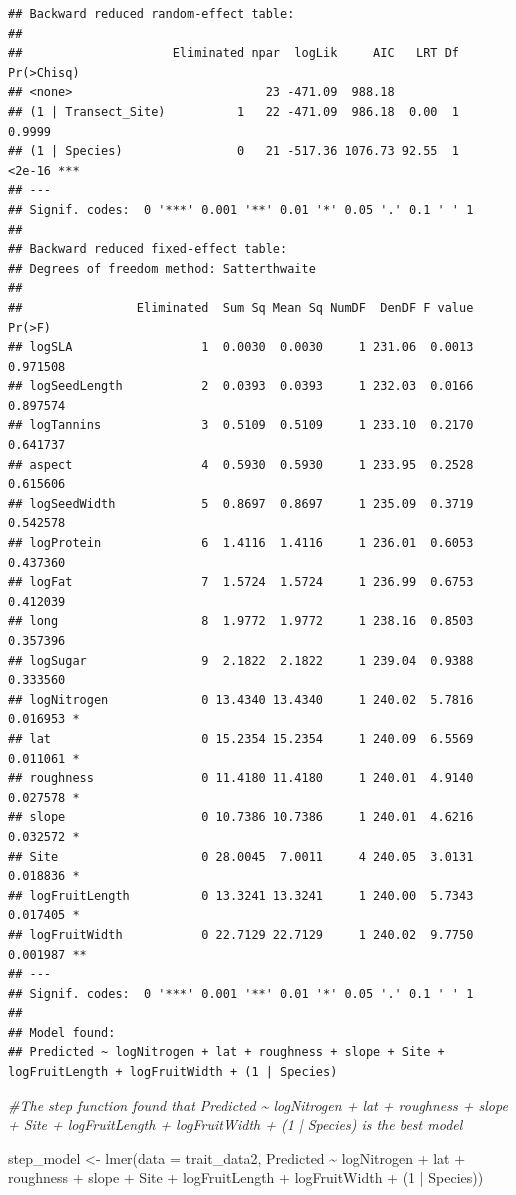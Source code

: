 \documentclass[
  12pt,
]{article}
\newenvironment{Shaded}{\begin{snugshade}}{\end{snugshade}}
\newcommand{\AttributeTok}[1]{\textcolor[rgb]{0.77,0.63,0.00}{#1}}
\newcommand{\CommentTok}[1]{\textcolor[rgb]{0.56,0.35,0.01}{\textit{#1}}}
\newcommand{\DecValTok}[1]{\textcolor[rgb]{0.00,0.00,0.81}{#1}}
\newcommand{\FunctionTok}[1]{\textcolor[rgb]{0.00,0.00,0.00}{#1}}
\newcommand{\NormalTok}[1]{#1}
\newcommand{\OtherTok}[1]{\textcolor[rgb]{0.56,0.35,0.01}{#1}}
\newcommand{\SpecialCharTok}[1]{\textcolor[rgb]{0.00,0.00,0.00}{#1}}
\begin{document}
\begin{verbatim}
## Backward reduced random-effect table:
## 
##                     Eliminated npar  logLik     AIC   LRT Df Pr(>Chisq)    
## <none>                           23 -471.09  988.18                        
## (1 | Transect_Site)          1   22 -471.09  986.18  0.00  1     0.9999    
## (1 | Species)                0   21 -517.36 1076.73 92.55  1     <2e-16 ***
## ---
## Signif. codes:  0 '***' 0.001 '**' 0.01 '*' 0.05 '.' 0.1 ' ' 1
## 
## Backward reduced fixed-effect table:
## Degrees of freedom method: Satterthwaite 
## 
##                Eliminated  Sum Sq Mean Sq NumDF  DenDF F value   Pr(>F)   
## logSLA                  1  0.0030  0.0030     1 231.06  0.0013 0.971508   
## logSeedLength           2  0.0393  0.0393     1 232.03  0.0166 0.897574   
## logTannins              3  0.5109  0.5109     1 233.10  0.2170 0.641737   
## aspect                  4  0.5930  0.5930     1 233.95  0.2528 0.615606   
## logSeedWidth            5  0.8697  0.8697     1 235.09  0.3719 0.542578   
## logProtein              6  1.4116  1.4116     1 236.01  0.6053 0.437360   
## logFat                  7  1.5724  1.5724     1 236.99  0.6753 0.412039   
## long                    8  1.9772  1.9772     1 238.16  0.8503 0.357396   
## logSugar                9  2.1822  2.1822     1 239.04  0.9388 0.333560   
## logNitrogen             0 13.4340 13.4340     1 240.02  5.7816 0.016953 * 
## lat                     0 15.2354 15.2354     1 240.09  6.5569 0.011061 * 
## roughness               0 11.4180 11.4180     1 240.01  4.9140 0.027578 * 
## slope                   0 10.7386 10.7386     1 240.01  4.6216 0.032572 * 
## Site                    0 28.0045  7.0011     4 240.05  3.0131 0.018836 * 
## logFruitLength          0 13.3241 13.3241     1 240.00  5.7343 0.017405 * 
## logFruitWidth           0 22.7129 22.7129     1 240.02  9.7750 0.001987 **
## ---
## Signif. codes:  0 '***' 0.001 '**' 0.01 '*' 0.05 '.' 0.1 ' ' 1
## 
## Model found:
## Predicted ~ logNitrogen + lat + roughness + slope + Site + logFruitLength + logFruitWidth + (1 | Species)
\end{verbatim}

\begin{Shaded}
\begin{Highlighting}[]
\CommentTok{\#The step function found that Predicted \textasciitilde{} logNitrogen + lat + roughness + slope + Site + logFruitLength + logFruitWidth + (1 | Species) is the best model}


\NormalTok{step\_model }\OtherTok{\textless{}{-}} \FunctionTok{lmer}\NormalTok{(}\AttributeTok{data =}\NormalTok{ trait\_data2, Predicted }\SpecialCharTok{\textasciitilde{}}\NormalTok{ logNitrogen }\SpecialCharTok{+}\NormalTok{ lat }\SpecialCharTok{+}\NormalTok{ roughness }\SpecialCharTok{+}\NormalTok{ slope }\SpecialCharTok{+}\NormalTok{ Site }\SpecialCharTok{+}\NormalTok{ logFruitLength }\SpecialCharTok{+}\NormalTok{ logFruitWidth }\SpecialCharTok{+}\NormalTok{ (}\DecValTok{1} \SpecialCharTok{|}\NormalTok{ Species))}
\end{Highlighting}
\end{Shaded}
\end{document}
